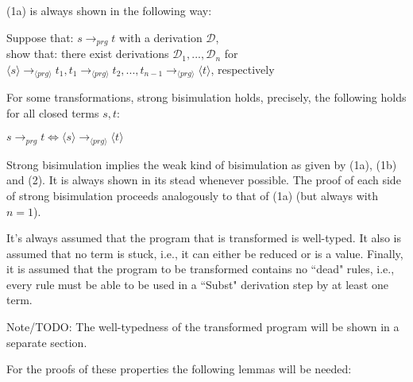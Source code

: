 \documentclass[11pt]{article} %
\begin{document}
(1a) is always shown in the following way:

Suppose that: $s \longrightarrow_{prg} t$ with a derivation $\mathcal{D}$, \\
show that: there exist derivations $\mathcal{D}_1, ..., \mathcal{D}_n$ for $\langle s \rangle \longrightarrow_{\langle prg \rangle} t_1, t_1 \longrightarrow_{\langle prg \rangle} t_2, ..., t_{n-1} \longrightarrow_{\langle prg \rangle} \langle t \rangle$, respectively

For some transformations, strong bisimulation holds, precisely, the following holds for all closed terms $s, t$:

$ s \longrightarrow_{prg} t \iff \langle s \rangle \longrightarrow_{\langle prg \rangle} \langle t \rangle$

Strong bisimulation implies the weak kind of bisimulation as given by (1a), (1b) and (2). It is always shown in its stead whenever possible. The proof of each side of strong bisimulation proceeds analogously to that of (1a) (but always with $n = 1$).

It's always assumed that the program that is transformed is well-typed. It also is assumed that no term is stuck, i.e., it can either be reduced or is a value. Finally, it is assumed that the program to be transformed contains no ``dead" rules, i.e., every rule must be able to be used in a ``Subst" derivation step by at least one term.

Note/TODO: The well-typedness of the transformed program will be shown in a separate section.

For the proofs of these properties the following lemmas will be needed:
\end{document}
